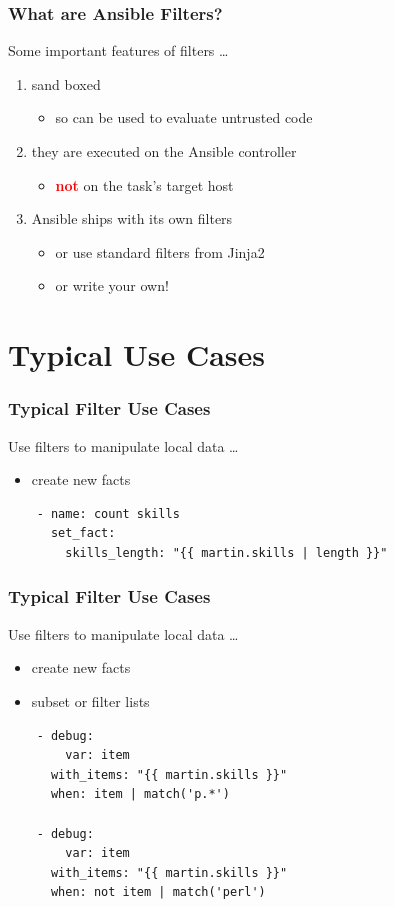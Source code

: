 \documentclass[pdf]{beamer}
\begin{document}
\begin{frame}
  \frametitle{What are Ansible Filters?}
  Some important features of filters \ldots
  \pause{}
  \begin{enumerate}
    \item<+->{sand boxed}
      \begin{itemize}
        \item<+->{so can be used to evaluate untrusted code}
      \end{itemize}
    \item<+->{they are executed on the Ansible controller}
      \begin{itemize}
        \item<+->{\textcolor{red}{\textbf{not}} on the task's target host}
      \end{itemize}
    \item<+->{Ansible ships with its own filters}
      \begin{itemize}
        \item<+->{or use standard filters from Jinja2}
        \item<+->{or write your own!}
      \end{itemize}
  \end{enumerate}
\end{frame}

\section{Typical Use Cases}

\begin{frame}[t,fragile]
  \frametitle{Typical Filter Use Cases}
  Use filters to manipulate local data \ldots
  \begin{itemize}
    \item \alert {create new facts}
  \end{itemize}
  \begin{lstlisting}
    - name: count skills
      set_fact:
        skills_length: "{{ martin.skills | length }}"
  \end{lstlisting}
\end{frame}

\begin{frame}[t,fragile]
  \frametitle{Typical Filter Use Cases}
  Use filters to manipulate local data \ldots
  \begin{itemize}
    \item {create new facts}
    \item \alert {subset or filter lists}
  \end{itemize}
  \begin{lstlisting}
    - debug:
        var: item
      with_items: "{{ martin.skills }}"
      when: item | match('p.*')

    - debug:
        var: item
      with_items: "{{ martin.skills }}"
      when: not item | match('perl')
  \end{lstlisting}
\end{frame}
\end{document}
